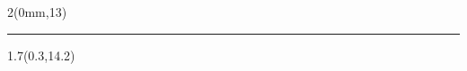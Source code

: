 \begin{textblock*}{2\TPHorizModule}(0mm,13\TPVertModule)
  \textcolor{white}{\rule{\linewidth}{8\TPVertModule}}
\end{textblock*}

\begin{textblock*}{1.7\TPHorizModule}(0.3\TPHorizModule,14.2\TPVertModule)
  \thetitle
\end{textblock*}

\endgroup

